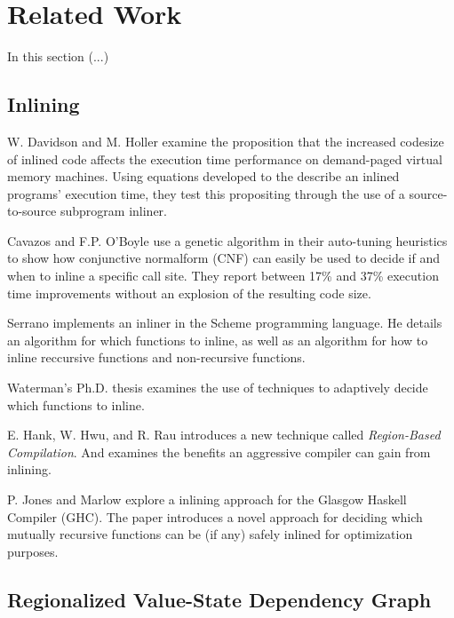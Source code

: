 
\section{Related Work}

In this section (...)

\subsection{Inlining}

W. Davidson and M. Holler \cite{SubprogInlining} examine the proposition that
the increased codesize of inlined code affects the execution time performance on
demand-paged virtual memory machines. Using equations developed to the describe
an inlined programs' execution time, they test this propositing through the use
of a source-to-source subprogram inliner.

Cavazos and F.P. O'Boyle \cite{AutoTuningJavaHeuristics} use a genetic algorithm
in their auto-tuning heuristics to show how conjunctive normalform (CNF) can
easily be used to decide if and when to inline a specific call site. They report
between 17\% and 37\% execution time improvements without an explosion of the resulting code size.

Serrano \cite{InlineWhenHowSerrano} implements an inliner in the Scheme
programming language. He details an algorithm for which functions to inline, as
well as an algorithm for how to inline reccursive functions and non-recursive
functions.

Waterman's Ph.D. thesis \cite{AdaptvCompilAndInlingWaterman} examines the use of
techniques to adaptively decide which functions to inline.

E. Hank, W. Hwu, and R. Rau \cite{RegionBasedCompilationIntroduction} introduces
a new technique called \textit{Region-Based Compilation}. And examines the
benefits an aggressive compiler can gain from inlining.

P. Jones and Marlow \cite{GHC-paper} explore a inlining approach for the Glasgow
Haskell Compiler (GHC). The paper introduces a novel approach for deciding which
mutually recursive functions can be (if any) safely inlined for optimization
purposes.

\subsection{Regionalized Value-State Dependency Graph}
